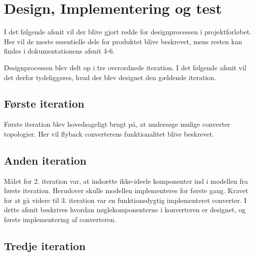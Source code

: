\chapter{Design, Implementering og test}
I det følgende afsnit vil der blive gjort redde for designprocessen i projektforløbet. Her vil de meste essentielle dele for produktet blive beskrevet, mens resten kan findes i dokumentationens afsnit 4-6.

Designprocessen blev delt op i tre overordnede iteration. I det følgende afsnit vil det derfor tydeliggøres, hvad der blev designet den gældende iteration. 

\section{Første iteration}
Første iteration blev hovedsageligt brugt på, at undersøge mulige converter topologier. Her vil flyback converterens funktionalitet blive beskrevet. 




\section{Anden iteration}
Målet for 2. iteration var, at indsætte ikke-ideele komponenter ind i modellen fra første iteration. Herudover skulle modellen implementeres for første gang. 
Kravet for at gå videre til 3. iteration var en funktionsdygtig implementeret converter. 
I dette afsnit beskrives hvordan nøglekomponenterne i konverteren er designet, og første implementering af converteren.



\section{Tredje iteration}






	
	
